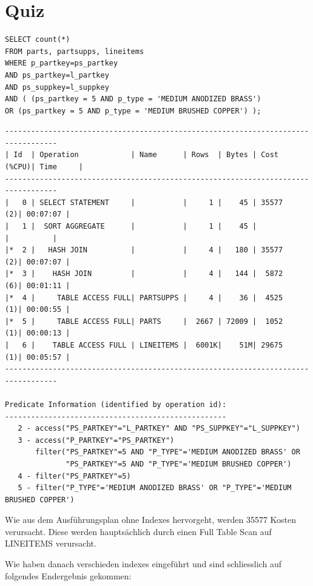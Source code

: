 \documentclass[10pt]{article}
\begin{document}
\section{Quiz}
\begin{lstlisting}[style=sql]
SELECT count(*)
FROM parts, partsupps, lineitems
WHERE p_partkey=ps_partkey
AND ps_partkey=l_partkey
AND ps_suppkey=l_suppkey
AND ( (ps_partkey = 5 AND p_type = 'MEDIUM ANODIZED BRASS')
OR (ps_partkey = 5 AND p_type = 'MEDIUM BRUSHED COPPER') );
\end{lstlisting}
\begin{lstlisting}[style=queryexecutionplan]
----------------------------------------------------------------------------------
| Id  | Operation            | Name      | Rows  | Bytes | Cost (%CPU)| Time     |
----------------------------------------------------------------------------------
|   0 | SELECT STATEMENT     |           |     1 |    45 | 35577   (2)| 00:07:07 |
|   1 |  SORT AGGREGATE      |           |     1 |    45 |            |          |
|*  2 |   HASH JOIN          |           |     4 |   180 | 35577   (2)| 00:07:07 |
|*  3 |    HASH JOIN         |           |     4 |   144 |  5872   (6)| 00:01:11 |
|*  4 |     TABLE ACCESS FULL| PARTSUPPS |     4 |    36 |  4525   (1)| 00:00:55 |
|*  5 |     TABLE ACCESS FULL| PARTS     |  2667 | 72009 |  1052   (1)| 00:00:13 |
|   6 |    TABLE ACCESS FULL | LINEITEMS |  6001K|    51M| 29675   (1)| 00:05:57 |
----------------------------------------------------------------------------------
 
Predicate Information (identified by operation id):
---------------------------------------------------
   2 - access("PS_PARTKEY"="L_PARTKEY" AND "PS_SUPPKEY"="L_SUPPKEY")
   3 - access("P_PARTKEY"="PS_PARTKEY")
       filter("PS_PARTKEY"=5 AND "P_TYPE"='MEDIUM ANODIZED BRASS' OR 
              "PS_PARTKEY"=5 AND "P_TYPE"='MEDIUM BRUSHED COPPER')
   4 - filter("PS_PARTKEY"=5)
   5 - filter("P_TYPE"='MEDIUM ANODIZED BRASS' OR "P_TYPE"='MEDIUM BRUSHED COPPER')
\end{lstlisting}
Wie aus dem Ausführungsplan ohne Indexes hervorgeht, werden 35577 Kosten verursacht. Diese 
werden hauptsächlich durch einen Full Table Scan auf LINEITEMS verursacht.

Wie haben danach verschieden indexes eingeführt und sind schliesslich auf folgendes Endergebnis gekommen:
\end{document}
